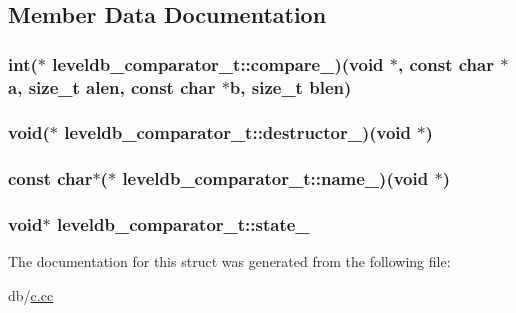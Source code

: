 \subsection{Member Data Documentation}
\hypertarget{structleveldb__comparator__t_a748ab1b07994228298b24331239dc3be}{
\subsubsection[{compare\-\_\-}]{\setlength{\rightskip}{0pt plus 5cm}int($\ast$ leveldb\-\_\-comparator\-\_\-t\-::compare\-\_\-)(void $\ast$, const char $\ast$a, size\-\_\-t alen, const char $\ast$b, size\-\_\-t blen)}}\label{structleveldb__comparator__t_a748ab1b07994228298b24331239dc3be}
\hypertarget{structleveldb__comparator__t_ae6edd4c00eb7f3769bc8c4c8ef4aece5}{
\subsubsection[{destructor\-\_\-}]{\setlength{\rightskip}{0pt plus 5cm}void($\ast$ leveldb\-\_\-comparator\-\_\-t\-::destructor\-\_\-)(void $\ast$)}}\label{structleveldb__comparator__t_ae6edd4c00eb7f3769bc8c4c8ef4aece5}
\hypertarget{structleveldb__comparator__t_ae639c988e591198174fbc7d043af8d2b}{
\subsubsection[{name\-\_\-}]{\setlength{\rightskip}{0pt plus 5cm}const char$\ast$($\ast$ leveldb\-\_\-comparator\-\_\-t\-::name\-\_\-)(void $\ast$)}}\label{structleveldb__comparator__t_ae639c988e591198174fbc7d043af8d2b}
\hypertarget{structleveldb__comparator__t_a720da927befa8098f21437c663d0b0e2}{
\subsubsection[{state\-\_\-}]{\setlength{\rightskip}{0pt plus 5cm}void$\ast$ leveldb\-\_\-comparator\-\_\-t\-::state\-\_\-}}\label{structleveldb__comparator__t_a720da927befa8098f21437c663d0b0e2}


The documentation for this struct was generated from the following file\-:\begin{DoxyCompactItemize}
\item 
db/\hyperlink{c_8cc}{c.\-cc}\end{DoxyCompactItemize}
